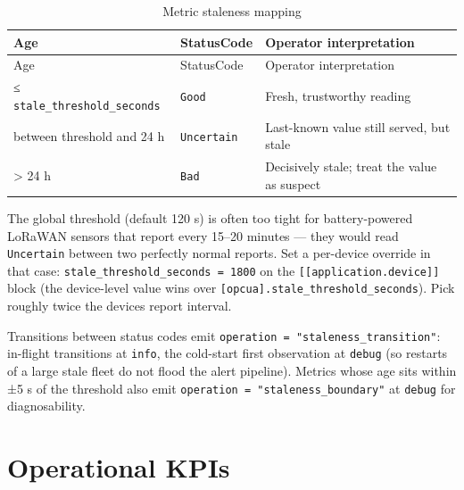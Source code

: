 \begin{longtable}[]{@{}lll@{}}
\caption{Metric staleness mapping}\tabularnewline
\toprule\noalign{}
Age & StatusCode & Operator interpretation \\
\midrule\noalign{}
\endfirsthead
\toprule\noalign{}
Age & StatusCode & Operator interpretation \\
\midrule\noalign{}
\endhead
\bottomrule\noalign{}
\endlastfoot
≤ \texttt{stale\_threshold\_seconds} & \texttt{Good} & Fresh, trustworthy reading \\
between threshold and 24 h & \texttt{Uncertain} & Last-known value still served, but stale \\
\textgreater{} 24 h & \texttt{Bad} & Decisively stale; treat the value as suspect \\
\end{longtable}

The global threshold (default 120 s) is often too tight for battery-powered LoRaWAN sensors that report every 15--20 minutes --- they would read \texttt{Uncertain} between two perfectly normal reports. Set a per-device override in that case: \texttt{stale\_threshold\_seconds\ =\ 1800} on the \texttt{{[}{[}application.device{]}{]}} block (the device-level value wins over \texttt{{[}opcua{]}.stale\_threshold\_seconds}). Pick roughly twice the device\textquotesingle s report interval.

Transitions between status codes emit \texttt{operation\ =\ "staleness\_transition"}: in-flight transitions at \texttt{info}, the cold-start first observation at \texttt{debug} (so restarts of a large stale fleet do not flood the alert pipeline). Metrics whose age sits within ±5 s of the threshold also emit \texttt{operation\ =\ "staleness\_boundary"} at \texttt{debug} for diagnosability.

\section{Operational KPIs}\label{sec-monitoring-metrics}

